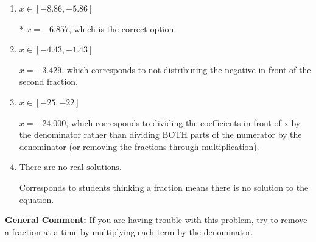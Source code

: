 \documentclass{extbook}[14pt]
\begin{document}
\begin{enumerate}
{\begin{enumerate}[label=\Alph*.]
 $x = -0.500$, which corresponds to dividing the second number in the numerator by the denominator rather than dividing BOTH parts of the numerator by the denominator (or removing the fractions through multiplication).
\item \( x \in [-8.86, -5.86] \)

* $x = -6.857$, which is the correct option.
\item \( x \in [-4.43, -1.43] \)

 $x = -3.429$, which corresponds to not distributing the negative in front of the second fraction.
\item \( x \in [-25, -22] \)

 $x = -24.000$, which corresponds to dividing the coefficients in front of x by the denominator rather than dividing BOTH parts of the numerator by the denominator (or removing the fractions through multiplication).
\item \( \text{There are no real solutions.} \)

Corresponds to students thinking a fraction means there is no solution to the equation.
\end{enumerate}

\textbf{General Comment:} If you are having trouble with this problem, try to remove a fraction at a time by multiplying each term by the denominator.
}
\end{enumerate}
\end{document}
